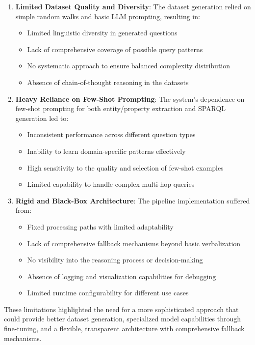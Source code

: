 \begin{enumerate}
    \item \textbf{Limited Dataset Quality and Diversity}: The dataset generation relied on simple random walks and basic LLM prompting, resulting in:
    \begin{itemize}
        \item Limited linguistic diversity in generated questions
        \item Lack of comprehensive coverage of possible query patterns
        \item No systematic approach to ensure balanced complexity distribution
        \item Absence of chain-of-thought reasoning in the datasets
    \end{itemize}
    
    \item \textbf{Heavy Reliance on Few-Shot Prompting}: The system's dependence on few-shot prompting for both entity/property extraction and SPARQL generation led to:
    \begin{itemize}
        \item Inconsistent performance across different question types
        \item Inability to learn domain-specific patterns effectively
        \item High sensitivity to the quality and selection of few-shot examples
        \item Limited capability to handle complex multi-hop queries
    \end{itemize}
    
    \item \textbf{Rigid and Black-Box Architecture}: The pipeline implementation suffered from:
    \begin{itemize}
        \item Fixed processing paths with limited adaptability
        \item Lack of comprehensive fallback mechanisms beyond basic verbalization
        \item No visibility into the reasoning process or decision-making
        \item Absence of logging and visualization capabilities for debugging
        \item Limited runtime configurability for different use cases
    \end{itemize}
\end{enumerate}

These limitations highlighted the need for a more sophisticated approach that could provide better dataset generation, specialized model capabilities through fine-tuning, and a flexible, transparent architecture with comprehensive fallback mechanisms.


